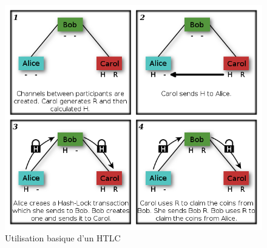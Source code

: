 \begin{figure}[h!]
    \centering
    \includegraphics[scale=0.35]{decentralisation/Timed-HashLocks-Diagram-Image.png}
    \caption{Utilisation basique d'un HTLC}
    \label{fig:HTLC}
\end{figure}
